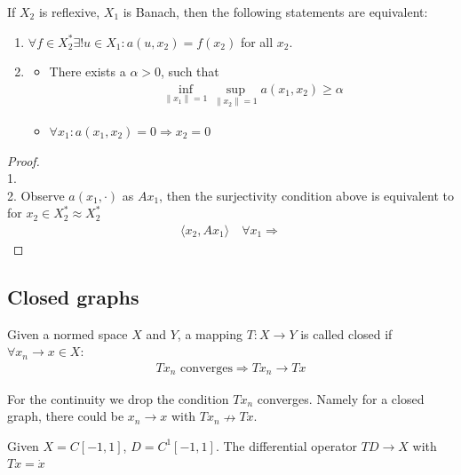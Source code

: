 \begin{theorem}
	If $X_2$ is reflexive, $X_1$ is Banach, then the following statements are equivalent:
	\begin{enumerate}
		\item $\forall f \in X^*_2 \exists ! u \in X_1: a(u, x_2) = f(x_2)$ for all $x_2$. 
		\item \begin{itemize}
			\item There exists a $\alpha > 0$, such that
			\begin{align*}
				\inf_{\|x_1\| = 1} \sup_{\|x_2\| = 1} a(x_1, x_2) \ge \alpha
			\end{align*}
			\item $\forall x_1: a(x_1, x_2) = 0 \Rightarrow x_2 = 0$
		\end{itemize}
	\end{enumerate}
\end{theorem}
\begin{proof}\quad\\
1. \\
2. Observe $a(x_1,  \cdot)$ as $Ax_1$, then the surjectivity condition above is equivalent to for $x_2 \in X_2^* \approx X_2^*$ 
\begin{align*}
	\langle x_2, Ax_1 \rangle \quad \forall x_1 \Rightarrow 
\end{align*}
\end{proof}




\subsection{Closed graphs}
\begin{definition}
	Given a normed space $X$ and $Y$, a mapping $T: X \rightarrow Y$ is called closed if $\forall x_n \rightarrow x \in X:$
	\begin{align*}
		 Tx_n \text{ converges} \Rightarrow Tx_n \rightarrow Tx
	\end{align*}
\end{definition}
\begin{remark}
For the continuity we drop the condition $Tx_n$ converges. Namely for a closed graph, there could be $x_n \rightarrow x$ with $Tx_n \nrightarrow Tx$. 	
\end{remark}

\begin{example}[DUIS]
	Given $X = C[-1, 1]$, $D = C^1[-1, 1]$. The differential operator $T D \rightarrow X$ with $Tx = \dot{x}$ 
\end{example}

